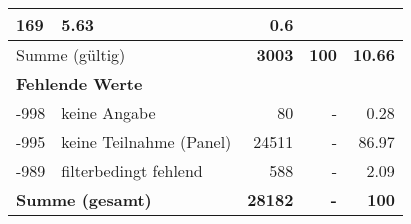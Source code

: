 \begin{longtable}{lXrrr}
       \num{169} &
       \num[round-mode=places,round-precision=2]{5.63} &
         \num[round-mode=places,round-precision=2]{0.6} \\
     \midrule
     \multicolumn{2}{l}{Summe (gültig)} &
       \textbf{\num{3003}} &
     \textbf{100} &
       \textbf{\num[round-mode=places,round-precision=2]{10.66}} \\
     \multicolumn{5}{l}{\textbf{Fehlende Werte}}\\
       -998 &
       keine Angabe &
         \num{80} &
        - &
         \num[round-mode=places,round-precision=2]{0.28} \\
       -995 &
       keine Teilnahme (Panel) &
         \num{24511} &
        - &
         \num[round-mode=places,round-precision=2]{86.97} \\
       -989 &
       filterbedingt fehlend &
         \num{588} &
        - &
         \num[round-mode=places,round-precision=2]{2.09} \\
     \midrule
     \multicolumn{2}{l}{\textbf{Summe (gesamt)}} &
          \textbf{\num{28182}} &
        \textbf{-} &
        \textbf{100} \\
     \bottomrule
     \end{longtable}
     
